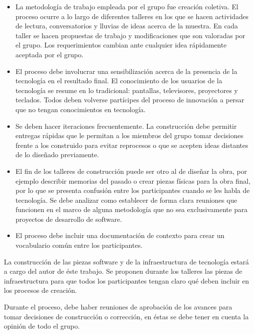 \begin{itemize}

    \item La metodología de trabajo empleada por el grupo fue creación coletiva. El proceso ocurre a lo largo de diferentes talleres en los que se hacen actividades de lectura, conversatorios y lluvias de ideas acerca de la muestra. En cada taller se hacen propuestas de trabajo y modificaciones que son valoradas por el grupo. Los requerimientos cambian ante cualquier idea rápidamente aceptada por el grupo.

    \item El proceso debe involucrar una sensibilización acerca de la presencia de la tecnología en el resultado final. El conocimiento de los usuarios de la tecnología se resume en lo tradicional: pantallas, televisores, proyectores y teclados. Todos deben volverse partícipes del proceso de innovación a persar que no tengan conocimientos en tecnología.

    \item Se deben hacer iteraciones frecuentemente. La construcción debe permitir entregas rápidas que le permitan a los miembros del grupo tomar decisiones frente a los construido para evitar reprocesos o que se acepten ideas distantes de lo diseñado previamente.

    \item El fin de los talleres de construcción puede ser otro al de diseñar la obra, por ejemplo describir memorias del pasado o crear piezas físicas para la obra final, por lo que se presenta confusión entre los participantes cuando se les habla de tecnología. Se debe analizar como establecer de forma clara reuniones que funcionen en el marco de alguna metodología que no sea exclusivamente para proyectos de desarrollo de software.

    \item El proceso debe incluir una documentación de contexto para crear un vocabulario común entre los participantes.

\end{itemize}

La construcción de las piezas software y de la infraestructura de tecnología estará a cargo del autor de éste trabajo. Se proponen durante los talleres las piezas de infraestructura para que todos los participantes tengan claro qué deben incluir en los procesos de creación.

Durante el proceso, debe haber reuniones de aprobación de los avances para tomar decisiones de construcción o corrección, en éstas se debe tener en cuenta la opinión de todo el grupo.

